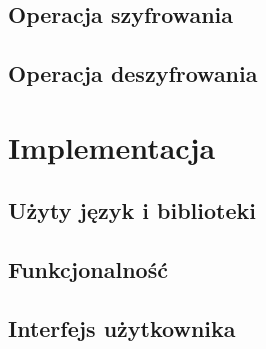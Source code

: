 \documentclass[10pt,a4paper]{article}
\begin{document}
\subsection{Operacja szyfrowania}
\subsection{Operacja deszyfrowania}

\section{Implementacja}
\subsection{Użyty język i biblioteki}
\subsection{Funkcjonalność}
\subsection{Interfejs użytkownika}


	
\end{document}
